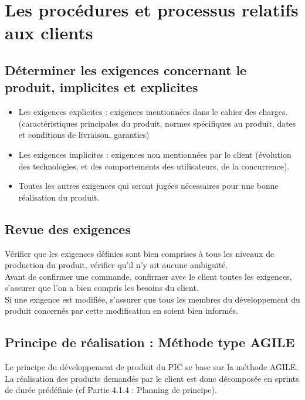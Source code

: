 \section{Les procédures et processus relatifs aux clients}
\label{client}

\subsection{Déterminer les exigences concernant le produit, implicites et explicites}

\begin{itemize}
\item Les exigences explicites : exigences mentionnées dans le cahier des charges. (caractéristiques principales du produit, normes spécifiques au produit, dates et conditions de livraison, garanties)
\item Les exigences implicites : exigences non mentionnées par le client (évolution des technologies, et des comportements des utilisateurs, de la concurrence).
\item Toutes les autres exigences qui seront jugées nécessaires pour une bonne réalisation du produit.
\end{itemize}

\subsection{Revue des exigences}

Vérifier que les exigences définies sont bien comprises à tous les niveaux de production du produit, vérifier qu’il n’y ait aucune ambiguïté. \\
Avant de confirmer une commande, confirmer avec le client toutes les exigences, s’assurer que l’on a bien compris les besoins du client.\\
Si une exigence est modifiée, s’assurer que tous les membres du développement du produit concernés par cette modification en soient bien informés.\\

\subsection{Principe de réalisation : Méthode type AGILE}
Le principe du développement de produit du PIC \nomPIC{} se base sur la méthode
AGILE. La réalisation des produits demandés par le client est donc décomposée en sprints de durée prédéfinie (cf Partie 4.1.4 : Planning de principe).


